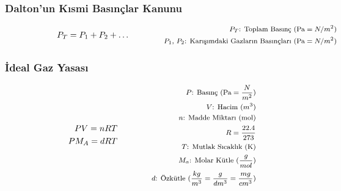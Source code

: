 \subsubsection*{Dalton'un Kısmi Basınçlar Kanunu}
\begin{equation}
    P_T = P_1 + P_2 + \dots \qquad \qquad \parbox{4cm}{\footnotesize$\begin{aligned}
        P_T\text{: Toplam Basınç (Pa} = N/m^2\text{)} \\
        P_1\text{, }P_2\text{: Karışımdaki Gazların Basınçları (Pa} = N/m^2\text{)}
\end{aligned}$}
\end{equation}

\subsubsection*{İdeal Gaz Yasası}
\begin{equation}
    \begin{aligned} 
        PV = nRT \\
        PM_A = dRT
    \end{aligned} \qquad \qquad \parbox{4cm}{\footnotesize$\begin{aligned}
        P\text{: Basınç (Pa} = \frac{N}{m^2}\text{)} \\
        V\text{: Hacim } (m^3) \\
        n\text{: Madde Miktarı (mol)} \\
        R = \frac{22.4}{273} \\
        T\text{: Mutlak Sıcaklık (K)} \\
        M_a\text{: Molar Kütle (} \frac{g}{mol} \text{)} \\
        d\text{: Özkütle } (\frac{kg}{m^3} = \frac{g}{dm^3} = \frac{mg}{cm^3})
\end{aligned}$}
\end{equation}
